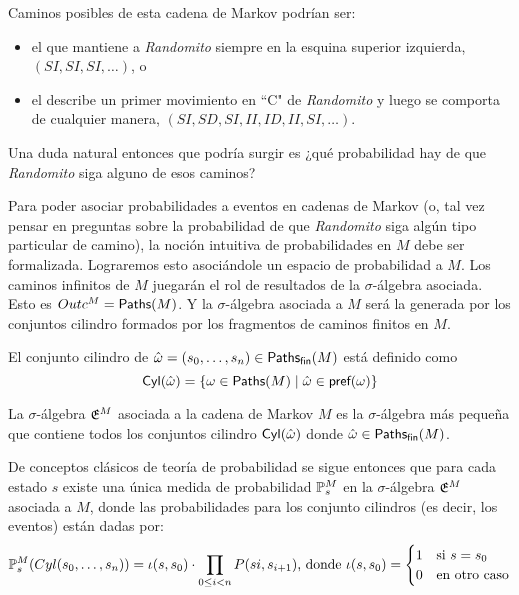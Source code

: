 Caminos posibles de esta cadena de Markov podrían ser:
\begin{itemize}
	\item el que mantiene a \emph{Randomito} siempre en la esquina superior izquierda,
	      $(SI, SI, SI, \dots)$, o
	\item el describe un primer movimiento en ``C" de \emph{Randomito} y luego se
	      comporta de cualquier manera, $(SI, SD, SI, II, ID, II, SI, \dots)$.
\end{itemize}

Una duda natural entonces que podría surgir es ¿qué probabilidad hay de que
\emph{Randomito} siga alguno de esos caminos?

Para poder asociar probabilidades a eventos en cadenas de Markov (o, tal vez
pensar en preguntas sobre la probabilidad de que \emph{Randomito} siga algún
tipo particular de camino), la noción intuitiva de probabilidades en $M$ debe
ser formalizada. Lograremos esto asociándole un espacio de probabilidad a $M$.
Los caminos infinitos de $M$ juegarán el rol de resultados de la
$\sigma$-álgebra asociada. Esto es $Outc^M = \textsf{Paths}(M)$. Y la $\sigma$-álgebra
asociada a $M$ será la generada por los conjuntos cilindro formados por los
fragmentos de caminos finitos en $M$.

\begin{definition}
	El conjunto cilindro de $\hat \omega = (s_0, \dots, s_n) \in \textsf{Paths}_\textsf{fin}(M)$ está definido como
	$$\textsf{Cyl}(\hat \omega) = \{\omega \in \textsf{Paths}(M) \mid \hat \omega \in \textsf{pref}(\omega)\}$$
\end{definition}

\begin{definition}
	La $\sigma$-álgebra $\mathfrak{E}^M$ asociada a la cadena de Markov $M$ es la $\sigma$-álgebra más pequeña que contiene todos los conjuntos cilindro $\textsf{Cyl}(\hat \omega)$ donde $\hat \omega \in \textsf{Paths}_\textsf{fin}(M)$.
\end{definition}

De conceptos clásicos de teoría de probabilidad se sigue entonces que para cada
estado $s$ existe una única medida de probabilidad $\mathbb{P}^M_{s}$ en la
$\sigma$-álgebra $\mathfrak{E}^M$ asociada a $M$, donde las probabilidades para los
conjunto cilindros (es decir, los eventos) están dadas por:
\begin{equation}
	\label{probMC}
	\mathbb{P}^M_{s}(Cyl(s_0, \dots, s_n)) = \iota(s,s_0) \cdot \prod_{0 \leq i < n} P(si, s_{i+1})\text{, donde }\iota(s,s_0) =
	\begin{cases}
		1 &\text{si } s = s_0 \\
		0 &\text{en otro caso}
	\end{cases}
\end{equation}

